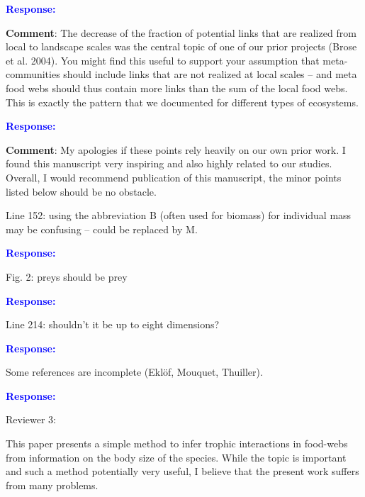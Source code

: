 \documentclass [12pt,onecolumn,twoside,openright]{report}
\begin{document}
\begin{onehalfspacing}
\medskip \textcolor{blue}{\textbf{Response:}} \textit{\textcolor{blue}{}}

\medskip \textbf{Comment}: The decrease of the fraction of
potential links that are realized from local to landscape scales was the central
topic of one of our prior projects (Brose et al. 2004). You might find this
useful to support your assumption that meta-communities should include links
that are not realized at local scales – and meta food webs should thus contain
more links than the sum of the local food webs. This is exactly the pattern that
we documented for different types of ecosystems.

\medskip \textcolor{blue}{\textbf{Response:}} \textit{\textcolor{blue}{}}

\medskip \textbf{Comment}: My apologies if these points rely
heavily on our own prior work. I found this manuscript very inspiring and also
highly related to our studies. Overall, I would recommend publication of this
manuscript, the minor points listed below should be no obstacle.

\medskip Line 152: using the abbreviation B (often used for
biomass) for individual mass may be confusing – could be replaced by M.

\textcolor{blue}{\textbf{Response:}} \textit{\textcolor{blue}{}}

\medskip Fig. 2: preys should be prey

\textcolor{blue}{\textbf{Response:}} \textit{\textcolor{blue}{}}

\medskip Line 214: shouldn't it be up to eight dimensions?

\textcolor{blue}{\textbf{Response:}} \textit{\textcolor{blue}{}}

\medskip Some references are incomplete (Eklöf, Mouquet,
Thuiller). 

\textcolor{blue}{\textbf{Response:}} \textit{\textcolor{blue}{}}



\begin{center} Reviewer 3: \end{center}

This paper presents a simple method to infer trophic interactions in food-webs
from information on the body size of the species. While the topic is important
and such a method potentially very useful, I believe that the present work
suffers from many problems.


\end{onehalfspacing}
\end{document}
